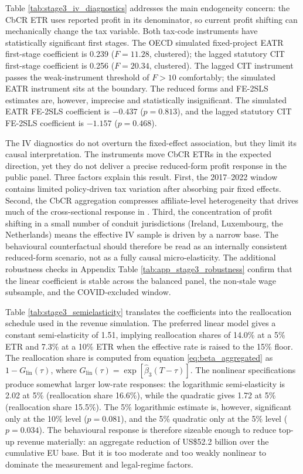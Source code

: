 \documentclass[11pt,a4paper]{article}
\begin{document}


Table \ref{tab:stage3_iv_diagnostics} addresses the main endogeneity concern: the CbCR ETR uses reported profit in its denominator, so current profit shifting can mechanically change the tax variable. Both tax-code instruments have statistically significant first stages. The OECD simulated fixed-project EATR first-stage coefficient is 0.239 ($F = 11.28$, clustered); the lagged statutory CIT first-stage coefficient is 0.256 ($F = 20.34$, clustered). The lagged CIT instrument passes the \citet{stock2005} weak-instrument threshold of $F > 10$ comfortably; the simulated EATR instrument sits at the boundary. The reduced forms and FE-2SLS estimates are, however, imprecise and statistically insignificant. The simulated EATR FE-2SLS coefficient is $-0.437$ ($p=0.813$), and the lagged statutory CIT FE-2SLS coefficient is $-1.157$ ($p=0.468$).

The IV diagnostics do not overturn the fixed-effect association, but they limit its causal interpretation. The instruments move CbCR ETRs in the expected direction, yet they do not deliver a precise reduced-form profit response in the public panel. Three factors explain this result. First, the 2017--2022 window contains limited policy-driven tax variation after absorbing pair fixed effects. Second, the CbCR aggregation compresses affiliate-level heterogeneity that drives much of the cross-sectional response in \citet{garcia-bernardo2024}. Third, the concentration of profit shifting in a small number of conduit jurisdictions (Ireland, Luxembourg, the Netherlands) means the effective IV sample is driven by a narrow base. The behavioural counterfactual should therefore be read as an internally consistent reduced-form scenario, not as a fully causal micro-elasticity. The additional robustness checks in Appendix Table \ref{tab:app_stage3_robustness} confirm that the linear coefficient is stable across the balanced panel, the non-stale wage subsample, and the COVID-excluded window.



Table \ref{tab:stage3_semielasticity} translates the coefficients into the reallocation schedule used in the revenue simulation. The preferred linear model gives a constant semi-elasticity of 1.51, implying reallocation shares of 14.0\% at a 5\% ETR and 7.3\% at a 10\% ETR when the effective rate is raised to the 15\% floor. The reallocation share is computed from equation \eqref{eq:beta_aggregated} as $1 - G_{\text{lin}}(\tau)$, where $G_{\text{lin}}(\tau) = \exp[\hat{\beta}_3 (T - \tau)]$. The nonlinear specifications produce somewhat larger low-rate responses: the logarithmic semi-elasticity is 2.02 at 5\% (reallocation share 16.6\%), while the quadratic gives 1.72 at 5\% (reallocation share 15.5\%). The 5\% logarithmic estimate is, however, significant only at the 10\% level ($p=0.081$), and the 5\% quadratic only at the 5\% level ($p=0.034$). The behavioural response is therefore sizeable enough to reduce top-up revenue materially: an aggregate reduction of US\$52.2 billion over the cumulative EU base. But it is too moderate and too weakly nonlinear to dominate the measurement and legal-regime factors.
\end{document}
